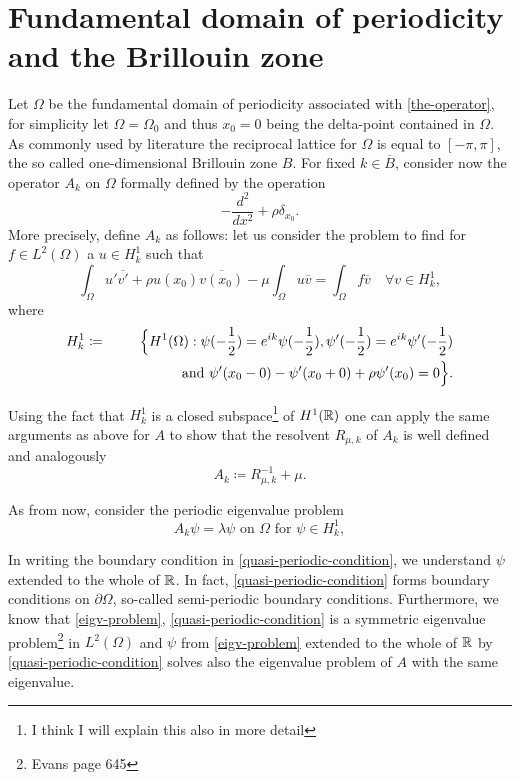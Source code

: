 \chapter{Fundamental domain of periodicity and the Brillouin zone}

Let $\Omega$ be the fundamental domain of periodicity associated with \eqref{the-operator}, for simplicity let $\Omega = \Omega_{0}$ and thus $x_{0} = 0$ being the delta-point contained in $\Omega$. As commonly used by literature the reciprocal lattice for $\Omega$ is equal to $[-\pi, \pi]$, the so called one-dimensional Brillouin zone $B$. For fixed $k \in \overline{B}$, consider now the operator $A_{k}$ on $\Omega$ formally defined by the operation
		\[ -\frac{d^{2}}{dx^{2}} + \rho \delta_{x_{0}}. \]
	More precisely, define $A_{k}$ as follows: let us consider the problem to find for $f \in L^{2}(\Omega)$ a $u \in H^{1}_{k}$ such that
	\[ \int_{\Omega} u' \overline{v'} + \rho u(x_{0}) \overline{v(x_{0})} - \mu \int_{\Omega} u \overline{v} = \int_{\Omega} f \overline{v} \quad \forall v \in H^{1}_{k}, \]
	where 
	\begin{eqnarray}
		H^{1}_{k} & \coloneqq & \Big\{ H^{1}(\Omega): \psi(-\frac{1}{2}) = e^{ik} \psi(-\frac{1}{2}), \psi'(-\frac{1}{2}) = e^{ik} \psi'(-\frac{1}{2}) \notag \\ & ~ &\qquad~\qquad  \text{ and } \psi'(x_{0} - 0) - \psi'(x_{0} + 0) + \rho \psi'(x_{0}) = 0 \Big\}. \label{quasi-periodic-condition}	
	\end{eqnarray}

 	Using the fact that $H^{1}_{k}$ is a closed subspace\footnote{I think I will explain this also in more detail} of $H^{1}(\mathbb{R})$ one can apply the same arguments as above for $A$ to show that the resolvent $R_{\mu, k}$ of $A_{k}$ is well defined and analogously
		\[ A_{k} \coloneqq R_{\mu, k}^{-1} + \mu. \] 
		
	As from now, consider the periodic eigenvalue problem
	\begin{equation}
		A_{k} \psi = \lambda \psi \text{ on } \Omega \text{ for } \psi \in H^{1}_{k}, \label{eigv-problem}
	\end{equation}

	In writing the boundary condition in \eqref{quasi-periodic-condition}, we understand $\psi$ extended to the whole of $\mathbb{R}$. In fact, \eqref{quasi-periodic-condition} forms boundary conditions on $\partial \Omega$, so-called semi-periodic boundary conditions. Furthermore, we know that \eqref{eigv-problem}, \eqref{quasi-periodic-condition} is a symmetric eigenvalue problem\footnote{Evans page 645} in $L^{2}(\Omega)$ and $\psi$ from \eqref{eigv-problem} extended to the whole of $\mathbb{R}$ by \eqref{quasi-periodic-condition} solves also the eigenvalue problem of $A$ with the same eigenvalue. \\
	
